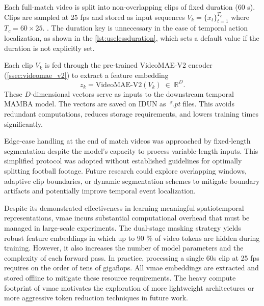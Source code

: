 
Each full‐match video is split into non‐overlapping clips of fixed duration (60 s). Clips are sampled at 25 fps and stored as input sequences $V_k=\{x_t\}_{t=1}^{T_c}$ where $T_c=60\times25$. . The duration key is unnecessary in the case of temporal action localization, as shown in the \autoref{lst:uselessduration}, which sets a default value if the duration is not explicitly set. 



Each clip $V_k$ is fed through the pre‐trained VideoMAE-V2 encoder (\autoref{ssec:videomae_v2}) to extract a feature embedding
\[
z_k = \mathrm{VideoMAE\text{-}V2}(V_k)\;\in\;\mathbb{R}^D.
\]
These $D$‐dimensional vectors serve as inputs to the downstream temporal MAMBA model. The vectors are saved on IDUN as \textit{*.pt} files. This avoids redundant computations, reduces storage requirements, and lowers training times significantly. 

Edge‐case handling at the end of match videos was approached by fixed‐length segmentation despite the model's capacity to process variable‐length inputs. This simplified protocol was adopted without established guidelines for optimally splitting football footage.  Future research could explore overlapping windows, adaptive clip boundaries, or dynamic segmentation schemes to mitigate boundary artifacts and potentially improve temporal event localization. 

Despite its demonstrated effectiveness in learning meaningful spatiotemporal representations, \acrlong{vmae} incurs substantial computational overhead that must be managed in large-scale experiments. The dual-stage masking strategy yields robust feature embeddings in which up to 90 \% of video tokens are hidden during training. However, it also increases the number of model parameters and the complexity of each forward pass. In practice, processing a single 60s clip at 25 fps requires on the order of tens of gigaflops\cite{wang_videomae_2023}. All \acrlong{vmae} embeddings are extracted and stored offline to mitigate these resource requirements. The heavy compute footprint of \acrlong{vmae} motivates the exploration of more lightweight architectures or more aggressive token reduction techniques in future work. 

